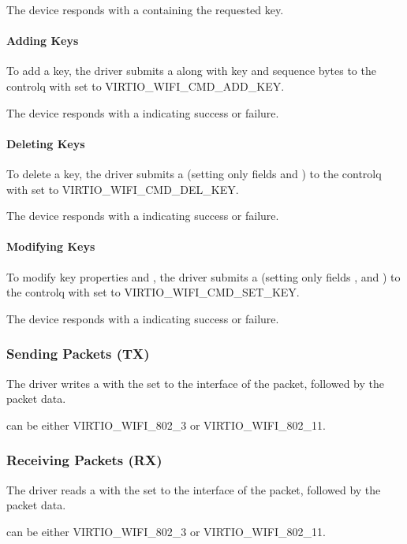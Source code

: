The device responds with a  containing the requested key.

\paragraph{Adding Keys}\label{sec:Device Types / 802.11 Device / Device Operation / Key Management / Adding keys}

To add a key, the driver submits a  along with key and sequence bytes to the controlq with  set to VIRTIO_WIFI_CMD_ADD_KEY.

The device responds with a  indicating success or failure.

\paragraph{Deleting Keys}\label{sec:Device Types / 802.11 Device / Device Operation / Key Management / Deleting keys}

To delete a key, the driver submits a  (setting only fields  and ) to the controlq with  set to VIRTIO_WIFI_CMD_DEL_KEY.

The device responds with a  indicating success or failure.

\paragraph{Modifying Keys}\label{sec:Device Types / 802.11 Device / Device Operation / Key Management / Modifying keys}

To modify key properties  and , the driver submits a  (setting only fields ,  and ) to the controlq with  set to VIRTIO_WIFI_CMD_SET_KEY.

The device responds with a  indicating success or failure.

\subsubsection{Sending Packets (TX)}\label{sec:Device Types / 802.11 Device / Device Operation / Packet TX}

The driver writes a  with the  set to the interface of the packet, followed by the packet data.

 can be either VIRTIO_WIFI_802_3 or VIRTIO_WIFI_802_11.

\subsubsection{Receiving Packets (RX)}\label{sec:Device Types / 802.11 Device / Device Operation / Packet RX}

The driver reads a  with the  set to the interface of the packet, followed by the packet data.

 can be either VIRTIO_WIFI_802_3 or VIRTIO_WIFI_802_11.
